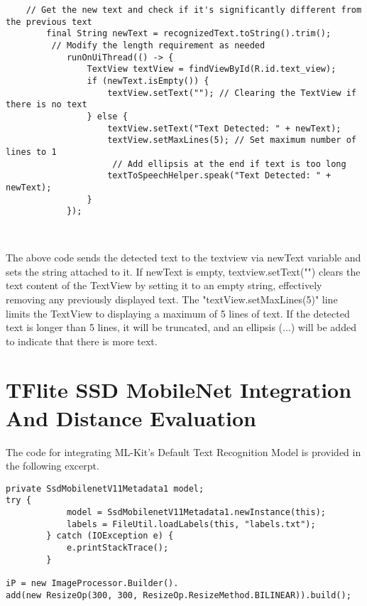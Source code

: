 \documentclass[MScCS]{uccthesis}
\begin{document}
\begin{scriptsize}
    \begin{verbatim}
    // Get the new text and check if it's significantly different from the previous text
        final String newText = recognizedText.toString().trim();
         // Modify the length requirement as needed
            runOnUiThread(() -> {
                TextView textView = findViewById(R.id.text_view);
                if (newText.isEmpty()) {
                    textView.setText(""); // Clearing the TextView if there is no text
                } else {
                    textView.setText("Text Detected: " + newText);
                    textView.setMaxLines(5); // Set maximum number of lines to 1
                     // Add ellipsis at the end if text is too long
                    textToSpeechHelper.speak("Text Detected: " + newText);
                }
            });
    
        
    \end{verbatim}
\end{scriptsize}
        
The above code sends the detected text to the textview via newText variable and sets the string attached to it. If newText is empty, textview.setText("") clears the text content of the TextView by setting it to an empty string, effectively removing any previously displayed text. The "textView.setMaxLines(5)" line limits the TextView to displaying a maximum of 5 lines of text. If the detected text is longer than 5 lines, it will be truncated, and an ellipsis (...) will be added to indicate that there is more text.


\section{TFlite SSD MobileNet Integration And Distance Evaluation}

The code for integrating ML-Kit's Default Text Recognition Model is provided in the following excerpt.

\begin{scriptsize}
    \begin{verbatim}
private SsdMobilenetV11Metadata1 model;
try {
            model = SsdMobilenetV11Metadata1.newInstance(this);
            labels = FileUtil.loadLabels(this, "labels.txt");
        } catch (IOException e) {
            e.printStackTrace();
        }

iP = new ImageProcessor.Builder().
add(new ResizeOp(300, 300, ResizeOp.ResizeMethod.BILINEAR)).build();

 \end{verbatim}
\end{scriptsize}
\end{document}
